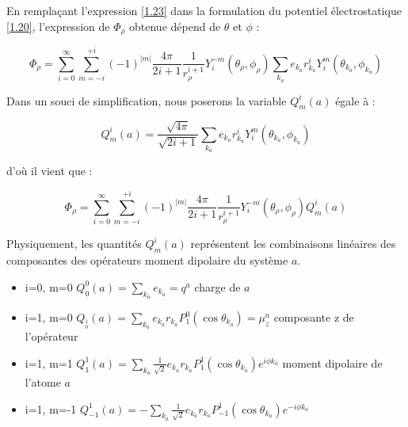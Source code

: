 	En remplaçant l'expression \ref{1.23} dans la formulation du potentiel électrostatique \ref{1.20}, l'expression de $\Phi_{\rho}$ obtenue dépend de $\theta$ et $\phi$ : 
	
	\begin{equation}
	\Phi_{\rho} = \sum_{i=0}^{\infty} \sum_{m=-i}^{+i} (-1)^{|m|}\frac{4\pi}{2i +1} \frac{1}{r_{\rho}^{i+1}} Y_{i}^{-m} (\theta_{\rho},\phi_{\rho}) \sum_{k_{a}} e_{k_{a}}r^{i}_{k_{a}} Y^{m}_{i} (\theta_{k_{a}}, \phi_{k_{a}})
	\end{equation}
	
	Dans un souci de simplification, nous poserons la variable $Q_{m}^{i}(a)$ égale à : 
	
	\begin{equation}
	Q_{m}^{i}(a)= \frac{\sqrt{4\pi}}{\sqrt{2i + 1}} \sum_{k_{a}} e_{k_{a}}r_{k_{a}}^{i} Y_{i}^{m} (\theta_{k_{a}}, \phi_{k_{a}}) \label{1.25}
	\end{equation}
	
	\noindent d'où il vient que :
	
	\begin{equation}
	\Phi_{\rho} = \sum_{i=0}^{\infty} \sum_{m=-i}^{+i} (-1)^{|m|} \frac{4\pi}{2i +1} \frac{1}{r_{\rho}^{i+1}} Y_{i}^{-m} (\theta_{\rho},\phi_{\rho})Q_{m}^{i}(a)
	\end{equation}
	
	Physiquement, les quantités $Q_{m}^{i}(a)$ représentent les combinaisons linéaires des composantes des opérateurs moment dipolaire du système $a$. 
	
	\begin{itemize}
		\item i=0, m=0 \hspace{0.9cm} $Q_{0}^{0}(a) = \sum_{k_{a}} e_{k_{a}} = q^{a}$ \hspace{3.5cm} charge de $a$
		\item i=1, m=0 \hspace{0.9cm} $Q_{_{0}^{1}}(a)= \sum_{k_{a}} e_{k_{a}} r_{k_{a}} P^{0}_{1} (\cos\theta_{k_{a}}) = \mu_{z}^{a}$ \hspace{1cm} composante z de l'opérateur	
		\item i=1, m=1 \hspace{0.9cm} $Q_{1}^{1}(a)= \sum_{k_{a}} \frac{1}{\sqrt{2}}e_{k_{a}} r_{k_{a}} P^{1}_{1} (\cos\theta_{k_{a}}) e^{i\phi k_{a}}$ \hspace{0.6cm} moment dipolaire de l'atome $a$
		\item i=1, m=-1 \hspace{0.9cm} $Q_{-1}^{1}(a) = -\sum_{k_{a}} \frac{1}{\sqrt{2}}e_{k_{a}} r_{k_{a}} P^{1}_{-1} (\cos\theta_{k_{a}}) e^{-i\phi k_{a}}$
	\end{itemize}
	
